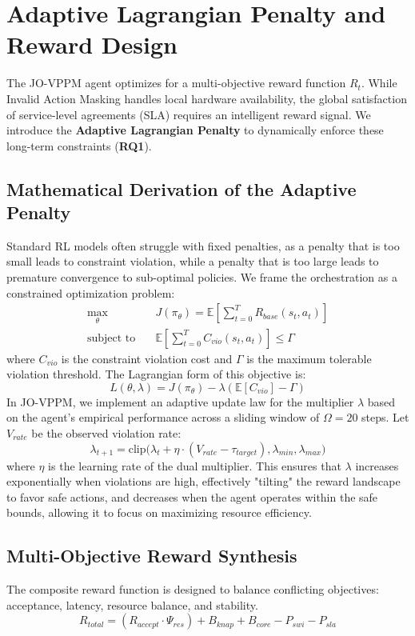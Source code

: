 \documentclass[12pt, a4paper, reqno, oneside]{book}
\begin{document}
\section{Adaptive Lagrangian Penalty and Reward Design}
The JO-VPPM agent optimizes for a multi-objective reward function $R_t$. While Invalid Action Masking handles local hardware availability, the global satisfaction of service-level agreements (SLA) requires an intelligent reward signal. We introduce the \textbf{Adaptive Lagrangian Penalty} to dynamically enforce these long-term constraints (\textbf{RQ1}).

\subsection{Mathematical Derivation of the Adaptive Penalty}
Standard RL models often struggle with fixed penalties, as a penalty that is too small leads to constraint violation, while a penalty that is too large leads to premature convergence to sub-optimal policies. We frame the orchestration as a constrained optimization problem:
\begin{align}
\max_{\theta} \quad & J(\pi_\theta) = \mathbb{E} [ \sum_{t=0}^T R_{base}(s_t, a_t) ] \\
\text{subject to} \quad & \mathbb{E} [ \sum_{t=0}^T C_{vio}(s_t, a_t) ] \le \Gamma
\end{align}
where $C_{vio}$ is the constraint violation cost and $\Gamma$ is the maximum tolerable violation threshold. The Lagrangian form of this objective is:
\begin{equation}
L(\theta, \lambda) = J(\pi_\theta) - \lambda \left( \mathbb{E} [ C_{vio} ] - \Gamma \right)
\end{equation}
In JO-VPPM, we implement an adaptive update law for the multiplier $\lambda$ based on the agent's empirical performance across a sliding window of $\Omega=20$ steps. Let $V_{rate}$ be the observed violation rate:
\begin{equation}
\lambda_{t+1} = \text{clip}\Big(\lambda_{t} + \eta \cdot (V_{rate} - \tau_{target}), \lambda_{min}, \lambda_{max} \Big)
\end{equation}
where $\eta$ is the learning rate of the dual multiplier. This ensures that $\lambda$ increases exponentially when violations are high, effectively "tilting" the reward landscape to favor safe actions, and decreases when the agent operates within the safe bounds, allowing it to focus on maximizing resource efficiency.

\subsection{Multi-Objective Reward Synthesis}
The composite reward function is designed to balance conflicting objectives: acceptance, latency, resource balance, and stability.
\begin{equation}
R_{total} = (R_{accept} \cdot \Psi_{res}) + B_{knap} + B_{core} - P_{swi} - P_{sla}
\end{equation}
\end{document}
